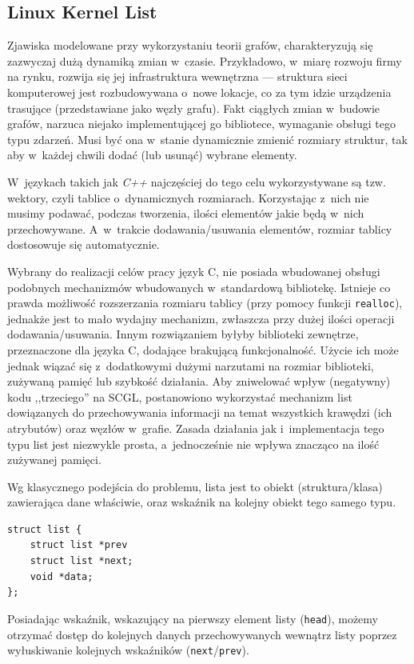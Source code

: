 \documentclass[a4paper,12pt,polish,oneside]{thesis}
\newcommand\code[1]{\lstinline[style=line]{#1}}
\begin{document}
\subsection{Linux Kernel List}
Zjawiska modelowane przy wykorzystaniu teorii grafów, charakteryzują się zazwyczaj dużą dynamiką zmian w~czasie.
Przykładowo, w~miarę rozwoju firmy na rynku, rozwija się jej infrastruktura wewnętrzna --- struktura sieci komputerowej jest rozbudowywana o~nowe lokacje, co za tym idzie urządzenia trasujące (przedstawiane jako węzły grafu).
Fakt ciągłych zmian w~budowie grafów, narzuca niejako implementującej go bibliotece, wymaganie obsługi tego typu zdarzeń.
Musi być ona w~stanie dynamicznie zmienić rozmiary struktur, tak aby w~każdej chwili dodać (lub usunąć) wybrane elementy.

W~językach takich jak \emph{C++} najczęściej do tego celu wykorzystywane są tzw. wektory, czyli tablice o~dynamicznych rozmiarach.
Korzystając z~nich nie musimy podawać, podczas tworzenia, ilości elementów jakie będą w~nich przechowywane.
A~w~trakcie dodawania/usuwania elementów, rozmiar tablicy dostosowuje się automatycznie.

Wybrany do realizacji celów pracy język C, nie posiada wbudowanej obsługi podobnych mechanizmów wbudowanych w~standardową bibliotekę.
Istnieje co prawda możliwość rozszerzania rozmiaru tablicy (przy pomocy funkcji \code{realloc}), jednakże jest to mało wydajny mechanizm, zwłaszcza przy dużej ilości operacji dodawania/usuwania.
Innym rozwiązaniem byłyby biblioteki zewnętrze, przeznaczone dla języka C, dodające brakującą funkcjonalność.
Użycie ich może jednak wiązać się z~dodatkowymi dużymi narzutami na rozmiar biblioteki, zużywaną pamięć lub szybkość działania.
Aby zniwelować wpływ (negatywny) kodu ,,trzeciego'' na SCGL, postanowiono wykorzystać mechanizm list dowiązanych do przechowywania informacji na temat wszystkich krawędzi (ich atrybutów) oraz węzłów w~grafie.
Zasada działania jak i~implementacja tego typu list jest niezwykle prosta, a~jednocześnie nie wpływa znacząco na ilość zużywanej pamięci.

Wg klasycznego podejścia do problemu, lista jest to obiekt (struktura/klasa) zawierająca dane właściwie, oraz wskaźnik na kolejny obiekt tego samego typu.
\begin{lstlisting}[style=code,caption=Idea listy powiązanej w~C]
struct list {
	struct list *prev
	struct list *next;
	void *data;
};
\end{lstlisting}
Posiadając wskaźnik, wskazujący na pierwszy element listy (\code{head}), możemy otrzymać dostęp do kolejnych danych przechowywanych wewnątrz listy poprzez wyłuskiwanie kolejnych wskaźników (\code{next}/\code{prev}).
\end{document}
